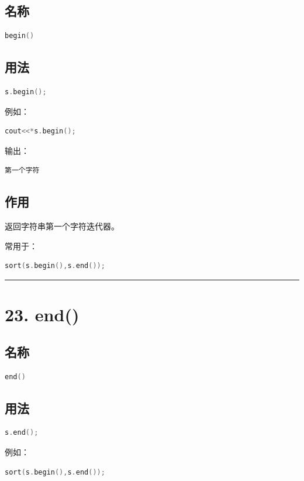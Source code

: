 \documentclass[9pt,twocolumn]{extarticle}
\begin{document}
\subsection{名称}
\begin{lstlisting}[language=C++]
begin()
\end{lstlisting}

\subsection{用法}
\begin{lstlisting}[language=C++]
s.begin();
\end{lstlisting}
例如：
\begin{lstlisting}[language=C++]
cout<<*s.begin();
\end{lstlisting}
输出：
\begin{lstlisting}
第一个字符
\end{lstlisting}

\subsection{作用}
返回字符串第一个字符迭代器。

常用于：
\begin{lstlisting}[language=C++]
sort(s.begin(),s.end());
\end{lstlisting}

\noindent\rule{\linewidth}{0.4pt}

\section{23. end()}

\subsection{名称}
\begin{lstlisting}[language=C++]
end()
\end{lstlisting}

\subsection{用法}
\begin{lstlisting}[language=C++]
s.end();
\end{lstlisting}
例如：
\begin{lstlisting}[language=C++]
sort(s.begin(),s.end());
\end{lstlisting}
\end{document}
